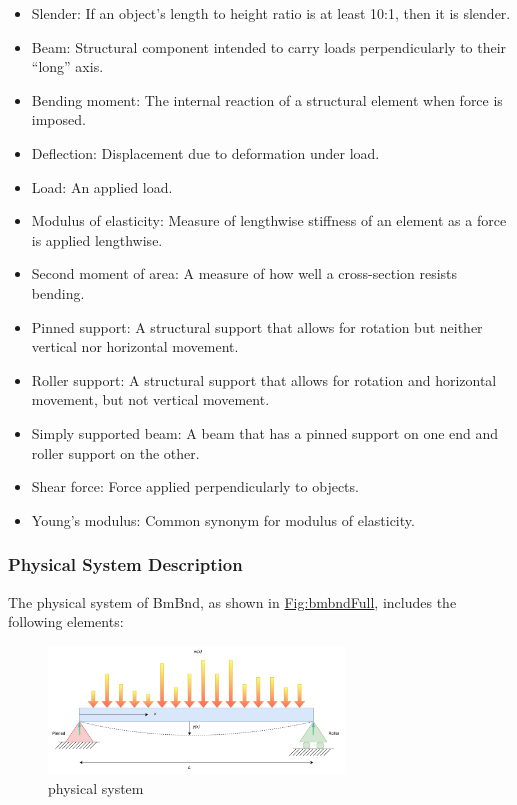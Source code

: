 \documentclass[12pt]{article}
\begin{document}
\begin{itemize}
\item{Slender: If an object's length to height ratio is at least 10:1, then it is slender.}
\item{Beam: Structural component intended to carry loads perpendicularly to their ``long'' axis.}
\item{Bending moment: The internal reaction of a structural element when force is imposed.}
\item{Deflection: Displacement due to deformation under load.}
\item{Load: An applied load.}
\item{Modulus of elasticity: Measure of lengthwise stiffness of an element as a force is applied lengthwise.}
\item{Second moment of area: A measure of how well a cross-section resists bending.}
\item{Pinned support: A structural support that allows for rotation but neither vertical nor horizontal movement.}
\item{Roller support: A structural support that allows for rotation and horizontal movement, but not vertical movement.}
\item{Simply supported beam: A beam that has a pinned support on one end and roller support on the other.}
\item{Shear force: Force applied perpendicularly to objects.}
\item{Young's modulus: Common synonym for modulus of elasticity.}
\end{itemize}
\subsubsection{Physical System Description}
\label{Sec:PhysSyst}
The physical system of BmBnd, as shown in \hyperref[Figure:bmbndFull]{Fig:bmbndFull}, includes the following elements:

\begin{figure}
\begin{center}
\includegraphics[width=0.7\textwidth]{../../../../datafiles/bmbnd/beam_bending_diagram_annotated.drawio.png}
\caption{physical system}
\label{Figure:bmbndFull}
\end{center}
\end{figure}
\end{document}

